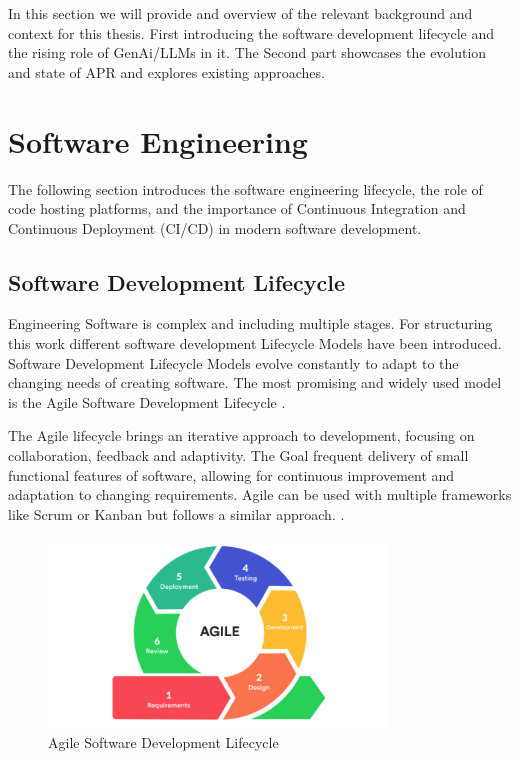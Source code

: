 In this section we will provide and overview of the relevant background and context for this thesis. First introducing the software development lifecycle and the rising role of GenAi/LLMs in it. The Second part showcases the evolution and state of APR and explores existing approaches.

\section{Software Engineering}
The following section introduces the software engineering lifecycle, the role of code hosting platforms, and the importance of Continuous Integration and Continuous Deployment (CI/CD) in modern software development.
\subsection{Software Development Lifecycle}
Engineering Software is complex and including multiple stages. For structuring this work different software development Lifecycle Models have been introduced. Software Development Lifecycle Models evolve constantly to adapt to the changing needs of creating software. The most promising and widely used model is the Agile Software Development Lifecycle \cite{rupareliaSoftwareDevelopmentLifecycle2010}.

The Agile lifecycle brings an iterative approach to development, focusing on collaboration, feedback and adaptivity. The Goal frequent delivery of small functional features of software, allowing for continuous improvement and adaptation to changing requirements. Agile can be used with multiple frameworks like Scrum or Kanban but follows a similar approach. \cite{rupareliaSoftwareDevelopmentLifecycle2010}.

\begin{figure}[htbp]
    \centering
    \includegraphics[width=0.8\textwidth]{images/agile-cycle.png}
    \caption{Agile Software Development Lifecycle}
    \label{fig:agile-cycle}
\end{figure}

